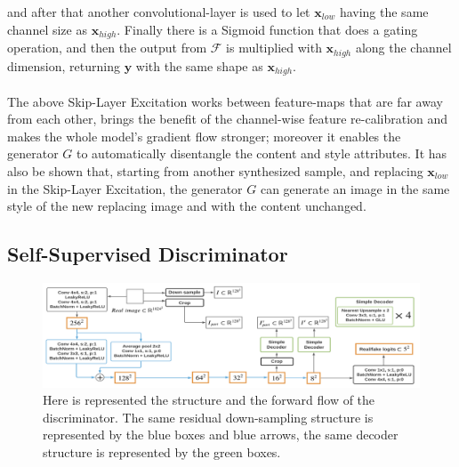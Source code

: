 \documentclass[12pt]{article}
\begin{document}
and after that another convolutional-layer is used to let $\mathbf{x}_{low}$ having the same channel size as $\mathbf{x}_{high}$. 
Finally there is a Sigmoid function that does a gating operation, and then the output from $\mathcal{F}$ is multiplied with 
$\mathbf{x}_{high}$ along the channel dimension, returning $\mathbf{y}$ with the same shape as $\mathbf{x}_{high}$.\\\\
The above Skip-Layer Excitation works between feature-maps that are far away from each other, brings the benefit of the channel-wise
feature re-calibration and makes the whole model’s gradient flow stronger; moreover it enables the generator $G$ to automatically 
disentangle the content and style attributes. It has also be shown that, starting from another synthesized sample, and replacing 
$\mathbf{x}_{low}$ in the Skip-Layer Excitation, the generator $G$ can generate an image in the same style of the new replacing 
image and with the content unchanged. 

\subsection{Self-Supervised Discriminator}

\begin{figure}[H]
	\label{fig:fig3}
	\includegraphics[width=1\textwidth]{Images/discriminator.png}
	\caption{
		Here is represented the structure and the forward flow of the discriminator.
		The same residual down-sampling structure is represented by the blue boxes and blue arrows,
		the same decoder structure is represented by the green boxes.
		}
\end{figure}
\end{document}
